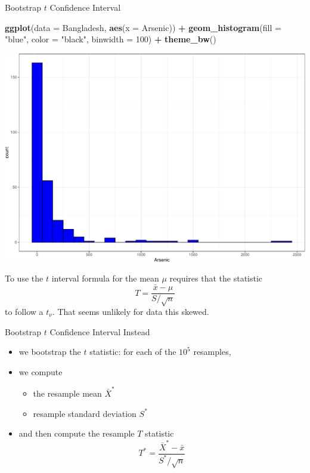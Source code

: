 \documentclass[
  ignorenonframetext,
]{beamer}
\newenvironment{Shaded}{\begin{snugshade}}{\end{snugshade}}
\newcommand{\AttributeTok}[1]{\textcolor[rgb]{0.13,0.29,0.53}{#1}}
\newcommand{\DecValTok}[1]{\textcolor[rgb]{0.00,0.00,0.81}{#1}}
\newcommand{\FunctionTok}[1]{\textcolor[rgb]{0.13,0.29,0.53}{\textbf{#1}}}
\newcommand{\NormalTok}[1]{#1}
\newcommand{\SpecialCharTok}[1]{\textcolor[rgb]{0.81,0.36,0.00}{\textbf{#1}}}
\newcommand{\StringTok}[1]{\textcolor[rgb]{0.31,0.60,0.02}{#1}}
\providecommand{\tightlist}{%
  \setlength{\itemsep}{0pt}\setlength{\parskip}{0pt}}
\begin{document}
\begin{frame}[fragile]{Bootstrap \(t\) Confidence Interval}
\protect\hypertarget{bootstrap-t-confidence-interval-2}{}
\tiny

\begin{Shaded}
\begin{Highlighting}[]
\FunctionTok{ggplot}\NormalTok{(}\AttributeTok{data =}\NormalTok{ Bangladesh, }\FunctionTok{aes}\NormalTok{(}\AttributeTok{x =}\NormalTok{ Arsenic)) }\SpecialCharTok{+} 
  \FunctionTok{geom\_histogram}\NormalTok{(}\AttributeTok{fill =} \StringTok{"blue"}\NormalTok{, }\AttributeTok{color =} \StringTok{"black"}\NormalTok{,}
                 \AttributeTok{binwidth =} \DecValTok{100}\NormalTok{) }\SpecialCharTok{+} 
  \FunctionTok{theme\_bw}\NormalTok{()}
\end{Highlighting}
\end{Shaded}

\begin{center}\includegraphics[width=0.6\linewidth,height=0.4\textheight]{Week11_12_13_files/figure-beamer/unnamed-chunk-23-1} \end{center}
\normalsize

To use the \(t\) interval formula for the mean \(\mu\) requires that the
statistic \[T=\frac{\bar{x}-\mu}{S/\sqrt{n}}\] to follow a \(t_{\nu}\).
That seems unlikely for data this skewed.
\end{frame}

\begin{frame}{Bootstrap \(t\) Confidence Interval}
\protect\hypertarget{bootstrap-t-confidence-interval-3}{}
Instead

\begin{itemize}
\item
  we bootstrap the \(t\) statistic: for each of the \(10^5\) resamples,
\item
  we compute

  \begin{itemize}
  \tightlist
  \item
    the resample mean \(\bar{X}^*\)
  \item
    resample standard deviation \(S^*\)
  \end{itemize}
\item
  and then compute the resample \(T\) statistic
  \[T^*=\frac{\bar{X}^*-\bar{x}}{S^*/\sqrt{n}}\]
\end{itemize}
\end{frame}
\end{document}
